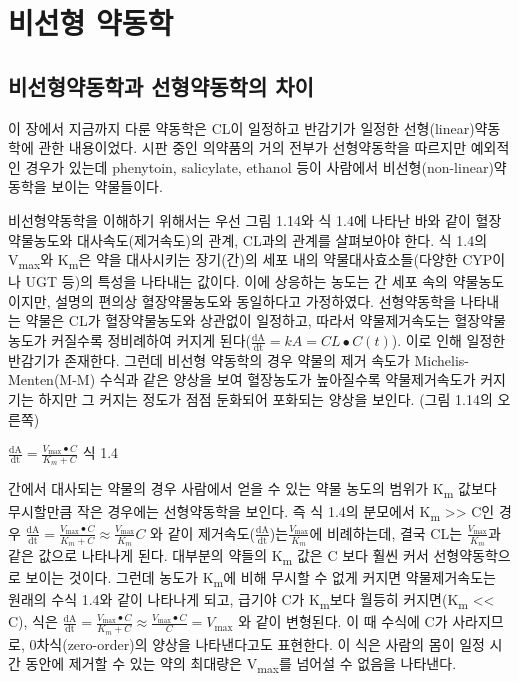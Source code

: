 \documentclass[
  11pt,
  krantz2, a4paper, twoside]{krantz}
\begin{document}
\hypertarget{uxbe44uxc120uxd615-uxc57duxb3d9uxd559}{%
\section{비선형 약동학}\label{uxbe44uxc120uxd615-uxc57duxb3d9uxd559}}

\hypertarget{uxbe44uxc120uxd615uxc57duxb3d9uxd559uxacfc-uxc120uxd615uxc57duxb3d9uxd559uxc758-uxcc28uxc774}{%
\subsection{비선형약동학과 선형약동학의 차이}\label{uxbe44uxc120uxd615uxc57duxb3d9uxd559uxacfc-uxc120uxd615uxc57duxb3d9uxd559uxc758-uxcc28uxc774}}

이 장에서 지금까지 다룬 약동학은 CL이 일정하고 반감기가 일정한
선형(linear)약동학에 관한 내용이었다. 시판 중인 의약품의 거의 전부가
선형약동학을 따르지만 예외적인 경우가 있는데 phenytoin, salicylate,
ethanol 등이 사람에서 비선형(non-linear)약동학을 보이는 약물들이다.

비선형약동학을 이해하기 위해서는 우선 그림 1.14와 식 1.4에 나타난 바와
같이 혈장 약물농도와 대사속도(제거속도)의 관계, CL과의 관계를 살펴보아야
한다. 식 1.4의 V\textsubscript{max}와 K\textsubscript{m}은 약을 대사시키는 장기(간)의 세포 내의
약물대사효소들(다양한 CYP이나 UGT 등)의 특성을 나타내는 값이다. 이에
상응하는 농도는 간 세포 속의 약물농도이지만, 설명의 편의상
혈장약물농도와 동일하다고 가정하였다. 선형약동학을 나타내는 약물은 CL가
혈장약물농도와 상관없이 일정하고, 따라서 약물제거속도는 혈장약물농도가
커질수록 정비례하여 커지게
된다(\(\frac{\text{dA}}{\text{dt}} = kA = CL \bullet C(t)\)). 이로 인해
일정한 반감기가 존재한다. 그런데 비선형 약동학의 경우 약물의 제거 속도가
Michelis-Menten(M-M) 수식과 같은 양상을 보여 혈장농도가 높아질수록
약물제거속도가 커지기는 하지만 그 커지는 정도가 점점 둔화되어 포화되는
양상을 보인다. (그림 1.14의 오른쪽)

\(\frac{\text{dA}}{\text{dt}} = \frac{V_{\max} \bullet C}{K_{m} + C}\) 식
1.4

간에서 대사되는 약물의 경우 사람에서 얻을 수 있는 약물 농도의 범위가
K\textsubscript{m} 값보다 무시할만큼 작은 경우에는 선형약동학을 보인다. 즉 식 1.4의
분모에서 K\textsubscript{m} \textgreater\textgreater{} C인 경우
\(\frac{\text{dA}}{\text{dt}} = \frac{V_{\max} \bullet C}{K_{m} + C} \approx \frac{V_{\max}}{K_{m}}C\)
와 같이
제거속도(\(\frac{\text{dA}}{\text{dt}}\))는\(\frac{V_{\max}}{K_{m}}\)에
비례하는데, 결국 CL는 \(\frac{V_{\max}}{K_{m}}\)과 같은 값으로 나타나게
된다. 대부분의 약들의 K\textsubscript{m} 값은 C 보다 훨씬 커서 선형약동학으로 보이는
것이다. 그런데 농도가 K\textsubscript{m}에 비해 무시할 수 없게 커지면 약물제거속도는
원래의 수식 1.4와 같이 나타나게 되고, 급기야 C가 K\textsubscript{m}보다 월등히
커지면(K\textsubscript{m} \textless\textless{} C), 식은
\(\frac{\text{dA}}{\text{dt}} = \frac{V_{\max} \bullet C}{K_{m} + C} \approx \frac{V_{\max} \bullet C}{C} = V_{\max}\)
와 같이 변형된다. 이 때 수식에 C가 사라지므로, 0차식(zero-order)의
양상을 나타낸다고도 표현한다. 이 식은 사람의 몸이 일정 시간 동안에
제거할 수 있는 약의 최대량은 V\textsubscript{max}를 넘어설 수 없음을 나타낸다.
\end{document}
